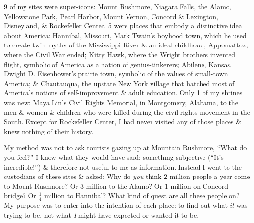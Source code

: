 \documentclass{article}
\begin{document}
9 of my sites were super-icons: Mount Rushmore, Niagara Falls, the Alamo, Yellowstone Park, Pearl Harbor, Mount Vernon, Concord \& Lexington, Disneyland, \& Rockefeller Center. 5 were places that embody a distinctive idea about America: Hannibal, Missouri, Mark Twain's boyhood town, which he used to create twin myths of the Mississippi River \& an ideal childhood; Appomattox, where the Civil War ended; Kitty Hawk, where the Wright brothers invented flight, symbolic of America as a nation of genius-tinkerers; Abilene, Kansas, Dwight D. Eisenhower's prairie town, symbolic of the values of small-town America; \& Chautauqua, the upstate New York village that hatched most of America's notions of self-improvement \& adult education. Only 1 of my shrines was new: Maya Lin's Civil Rights Memorial, in Montgomery, Alabama, to the men \& women \& children who were killed during the civil rights movement in the South. Except for Rockefeller Center, I had never visited any of those places \& knew nothing of their history.

My method was not to ask tourists gazing up at Mountain Rushmore, ``What do you feel?'' I know what they would have said: something subjective (``It's incredible!'') \& therefore not useful to me as information. Instead I went to the custodians of these sites \& asked: Why do \textit{you} think 2 million people a year come to Mount Rushmore? Or 3 million to the Alamo? Or 1 million on Concord bridge? Or $\frac{1}{4}$ million to Hannibal? What kind of quest are all these people on? My purpose was to enter into the intention of each place: to find out what \textit{it} was trying to be, not what \textit{I} might have expected or wanted it to be.
\end{document}
